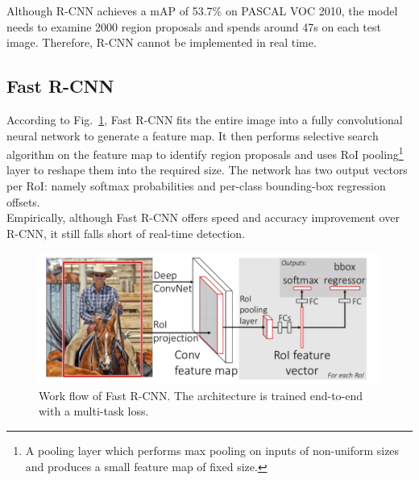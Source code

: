 \documentclass[letterpaper]{article} %
\begin{document}
\noindent Although R-CNN achieves a mAP of 53.7\% on PASCAL VOC 2010, the model needs to examine 2000 region proposals and spends around 47s on each test image. Therefore, R-CNN cannot be implemented in real time.

\subsection{Fast R-CNN}
According to Fig.~\ref{fig:fast_2}, Fast R-CNN fits the entire image into a fully convolutional neural network to generate a feature map. It then performs selective search algorithm on the feature map to identify region proposals and uses RoI pooling\footnote{A pooling layer which performs max pooling on inputs of non-uniform sizes and produces a small feature map of fixed size.} layer to reshape them into the required size. The network has two output vectors per RoI: namely softmax probabilities and per-class bounding-box regression offsets.\\

\noindent Empirically, although Fast R-CNN offers speed and accuracy improvement over R-CNN, it still falls short of real-time detection.
\begin{figure}[ht]
\hspace{0mm}
\centering
\includegraphics[scale=0.23]{Figure/fast_r_cnn.png}
\caption{\footnotesize{Work flow of Fast R-CNN. The architecture is trained end-to-end with a multi-task loss.}}
\label{fig:fast_2}
\vspace{-2mm}
\end{figure}

\end{document}
